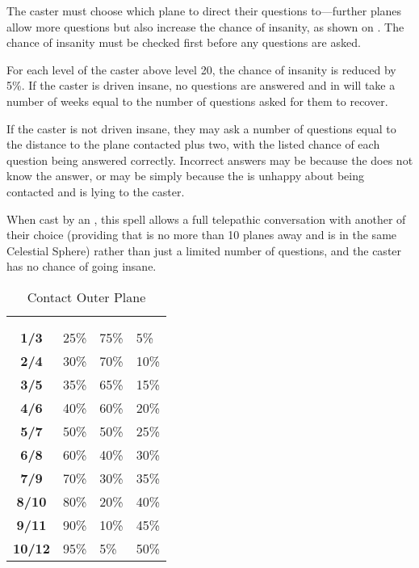 \begin{multicols*}{2}
The caster must choose which plane to direct their questions to—further planes allow more questions but also increase the chance of insanity, as shown on . The chance of insanity must be checked first before any questions are asked.

For each level of the caster above level 20, the chance of insanity is reduced by 5\%. If the caster is driven insane, no questions are answered and in will take a number of weeks equal to the number of questions asked for them to recover.

If the caster is not driven insane, they may ask a number of questions equal to the distance to the plane contacted plus two, with the listed chance of each question being answered correctly. Incorrect answers may be because the  does not know the answer, or may be simply because the  is unhappy about being contacted and is lying to the caster.

When cast by an , this spell allows a full telepathic conversation with another  of their choice (providing that  is no more than 10 planes away and is in the same Celestial Sphere) rather than just a limited number of questions, and the caster has no chance of going insane.

\begin {table}[H]
  \caption{Contact Outer Plane}\label{tab:Contact Outer Plane}
  \begin{tabularx}{\columnwidth}{>{\bfseries}cYYY}
	\thead{} & \\
	 &  &  & \\
	1/3 & 25\% & 75\% & 5\%\\
	2/4 & 30\% & 70\% & 10\%\\
	3/5 & 35\% & 65\% & 15\%\\
	4/6 & 40\% & 60\% & 20\%\\
	5/7 & 50\% & 50\% & 25\%\\
	6/8 & 60\% & 40\% & 30\%\\
	7/9 & 70\% & 30\% & 35\%\\
	8/10 & 80\% & 20\% & 40\%\\
	9/11 & 90\% & 10\% & 45\%\\
	10/12 & 95\% & 5\% & 50\%
  \end {tabularx}
\end {table}


\end{multicols*}

